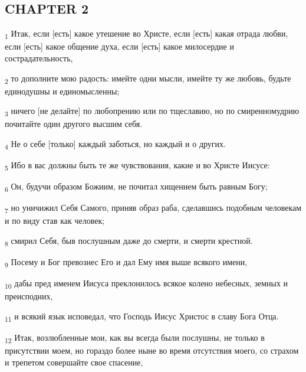 \subsection{CHAPTER 2}
\begin{tcolorbox}
\textsubscript{1} Итак, если [есть] какое утешение во Христе, если [есть] какая отрада любви, если [есть] какое общение духа, если [есть] какое милосердие и сострадательность,
\end{tcolorbox}
\begin{tcolorbox}
\textsubscript{2} то дополните мою радость: имейте одни мысли, имейте ту же любовь, будьте единодушны и единомысленны;
\end{tcolorbox}
\begin{tcolorbox}
\textsubscript{3} ничего [не делайте] по любопрению или по тщеславию, но по смиренномудрию почитайте один другого высшим себя.
\end{tcolorbox}
\begin{tcolorbox}
\textsubscript{4} Не о себе [только] каждый заботься, но каждый и о других.
\end{tcolorbox}
\begin{tcolorbox}
\textsubscript{5} Ибо в вас должны быть те же чувствования, какие и во Христе Иисусе:
\end{tcolorbox}
\begin{tcolorbox}
\textsubscript{6} Он, будучи образом Божиим, не почитал хищением быть равным Богу;
\end{tcolorbox}
\begin{tcolorbox}
\textsubscript{7} но уничижил Себя Самого, приняв образ раба, сделавшись подобным человекам и по виду став как человек;
\end{tcolorbox}
\begin{tcolorbox}
\textsubscript{8} смирил Себя, быв послушным даже до смерти, и смерти крестной.
\end{tcolorbox}
\begin{tcolorbox}
\textsubscript{9} Посему и Бог превознес Его и дал Ему имя выше всякого имени,
\end{tcolorbox}
\begin{tcolorbox}
\textsubscript{10} дабы пред именем Иисуса преклонилось всякое колено небесных, земных и преисподних,
\end{tcolorbox}
\begin{tcolorbox}
\textsubscript{11} и всякий язык исповедал, что Господь Иисус Христос в славу Бога Отца.
\end{tcolorbox}
\begin{tcolorbox}
\textsubscript{12} Итак, возлюбленные мои, как вы всегда были послушны, не только в присутствии моем, но гораздо более ныне во время отсутствия моего, со страхом и трепетом совершайте свое спасение,
\end{tcolorbox}

